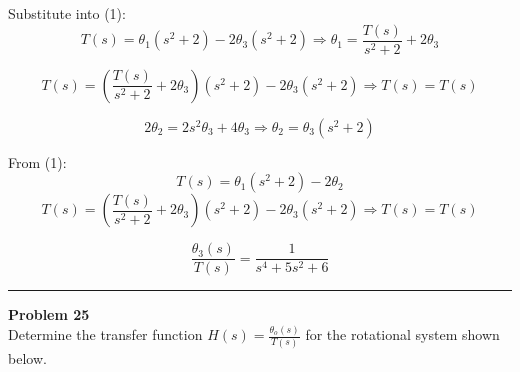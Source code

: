 Substitute into (1):
\[
T(s) = \theta_1(s^2 + 2) - 2\theta_3(s^2 + 2)
\Rightarrow \theta_1 = \frac{T(s)}{s^2 + 2} + 2\theta_3
\]

\[
T(s) = \left( \frac{T(s)}{s^2 + 2} + 2\theta_3 \right)(s^2 + 2) - 2\theta_3(s^2 + 2)
\Rightarrow T(s) = T(s)
\]

\[
2\theta_2 = 2s^2 \theta_3 + 4\theta_3
\Rightarrow \theta_2 = \theta_3(s^2 + 2)
\]

From (1):
\[
T(s) = \theta_1(s^2 + 2) - 2\theta_2
\]
\[
T(s) = \left( \frac{T(s)}{s^2 + 2} + 2\theta_3 \right)(s^2 + 2) - 2\theta_3(s^2 + 2)
\Rightarrow T(s) = T(s)
\]

\[
\boxed{\frac{\theta_3(s)}{T(s)} = \frac{1}{s^4 + 5s^2 + 6}}
\]

\newpage

\noindent\rule{\textwidth}{1pt}
\noindent\textbf{Problem 25} \hfill
\\ Determine the transfer function \(H(s) = \frac{\theta_o(s)}{T(s)}\) for the rotational system shown below.

